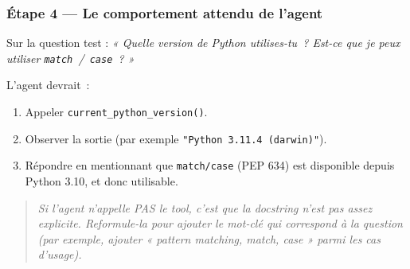 \documentclass[11pt,a4paper]{article}
\begin{document}
\subsubsection*{Étape 4 — Le comportement attendu de l'agent}

Sur la question test :
\emph{« Quelle version de Python utilises-tu~? Est-ce que je peux
utiliser \texttt{match}~/~\texttt{case}~? »}

L'agent devrait~:
\begin{enumerate}[leftmargin=*]
  \item Appeler \texttt{current\_python\_version()}.
  \item Observer la sortie (par exemple \texttt{"Python 3.11.4 (darwin)"}).
  \item Répondre en mentionnant que \texttt{match/case} (PEP 634) est
        disponible depuis Python 3.10, et donc utilisable.
\end{enumerate}

\begin{quote}\itshape
Si l'agent n'appelle PAS le tool, c'est que la docstring n'est pas
assez explicite. Reformule-la pour ajouter le mot-clé qui correspond à
la question (par exemple, ajouter « pattern matching, match, case »
parmi les cas d'usage).
\end{quote}
\end{document}
